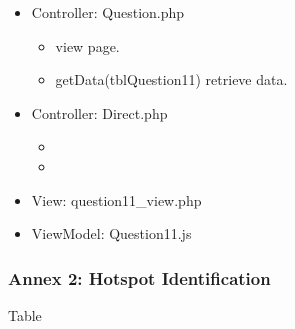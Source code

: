 \documentclass[letterpaper,10pt,english,openany,oneside]{sphinxmanual}
\begin{document}
\begin{sphinxVerbatim}[commandchars=\\\{\}]
               
  
               
\end{sphinxVerbatim}
\begin{itemize}
\item {} 
\sphinxAtStartPar
Controller: Question.php
\begin{itemize}
\item {} 
\sphinxAtStartPar
{} view page.

\item {} 
\sphinxAtStartPar
getData(tblQuestion11) retrieve data.

\end{itemize}

\item {} 
\sphinxAtStartPar
Controller: Direct.php
\begin{itemize}
\item {} 
\sphinxAtStartPar
{}

\item {} 
\sphinxAtStartPar
{}

\end{itemize}

\item {} 
\sphinxAtStartPar
View: question11\_view.php

\item {} 
\sphinxAtStartPar
ViewModel: Question11.js

\end{itemize}


\subsubsection{Annex 2: Hotspot Identification}
\label{\detokenize{module/module:annex-2-hotspot-identification}}
\sphinxAtStartPar
Table
\end{document}
